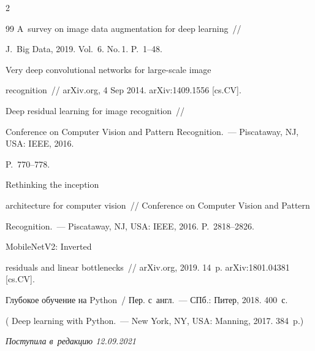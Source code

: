 \begin{multicols}{2}
{{\begin{thebibliography}{99}
 A~survey on image data augmentation for deep learning~// 

J.~Big Data, 2019. Vol.~6. No.\,1. P.~1--48.


 Very deep convolutional networks for large-scale image 

recognition~// arXiv.org, 4 Sep 2014. arXiv:1409.1556 [cs.CV].


 Deep residual learning for image recognition~//

Conference on Computer Vision and Pattern Recognition.~--- Piscataway, NJ, USA: IEEE, 2016.  

P.~770--778.


 Rethinking the inception 

architecture for computer vision~// Conference on Computer Vision and Pattern 

Recognition.~--- Piscataway, NJ, USA: IEEE, 2016. P.~2818--2826.


 MobileNetV2: Inverted 

residuals and linear bottlenecks~// arXiv.org, 2019. 14~p. arXiv:1801.04381  [cs.CV].


 Глубокое обучение на Python~/ Пер. с~англ.~--- СПб.: Питер, 2018. 400~с. 

( Deep learning with Python.~--- New York, NY, USA: Manning, 2017. 384~p.) 

 \end{thebibliography}



}

}



\end{multicols}



\vspace*{-3pt}



\hfill{\small\textit{Поступила в~редакцию 12.09.2021}}



